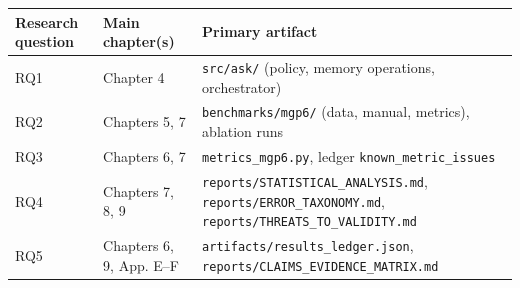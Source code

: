 {\def\LTcaptype{none} %
\begin{longtable}[]{@{}
  >{\raggedright\arraybackslash}p{}
  >{\raggedright\arraybackslash}p{}
  >{\raggedright\arraybackslash}p{}@{}}
\toprule\noalign{}
\begin{minipage}[b]{\linewidth}\raggedright
Research question
\end{minipage} & \begin{minipage}[b]{\linewidth}\raggedright
Main chapter(s)
\end{minipage} & \begin{minipage}[b]{\linewidth}\raggedright
Primary artifact
\end{minipage} \\
\midrule\noalign{}
\endhead
\bottomrule\noalign{}
\endlastfoot
RQ1 & Chapter 4 & \texttt{src/ask/} (policy, memory operations,
orchestrator) \\
RQ2 & Chapters 5, 7 & \texttt{benchmarks/mgp6/} (data, manual, metrics),
ablation runs \\
RQ3 & Chapters 6, 7 & \texttt{metrics\_mgp6.py}, ledger
\texttt{known\_metric\_issues} \\
RQ4 & Chapters 7, 8, 9 & \texttt{reports/STATISTICAL\_ANALYSIS.md},
\texttt{reports/ERROR\_TAXONOMY.md},
\texttt{reports/THREATS\_TO\_VALIDITY.md} \\
RQ5 & Chapters 6, 9, App. E--F &
\texttt{artifacts/results\_ledger.json},
\texttt{reports/CLAIMS\_EVIDENCE\_MATRIX.md} \\
\end{longtable}
}
